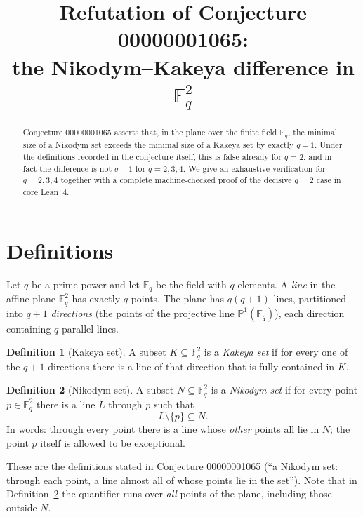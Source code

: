 \documentclass[11pt]{article}
\title{Refutation of Conjecture 00000001065:\\
the Nikodym--Kakeya difference in $\mathbb{F}_q^2$}
\author{}
\date{}
\theoremstyle{definition}
\newtheorem{definition}{Definition}
\theoremstyle{remark}
\begin{document}
\maketitle

\begin{abstract}
Conjecture 00000001065 asserts that, in the plane over the finite field
$\mathbb{F}_q$, the minimal size of a Nikodym set exceeds the minimal size of
a Kakeya set by exactly $q-1$. Under the definitions recorded in the
conjecture itself, this is false already for $q=2$, and in fact the difference
is not $q-1$ for $q=2,3,4$. We give an exhaustive verification for
$q=2,3,4$ together with a complete machine-checked proof of the decisive
$q=2$ case in core Lean~4.
\end{abstract}

\section{Definitions}

Let $q$ be a prime power and let $\mathbb{F}_q$ be the field with $q$
elements. A \emph{line} in the affine plane $\mathbb{F}_q^2$ has exactly $q$
points. The plane has $q(q+1)$ lines, partitioned into $q+1$ \emph{directions}
(the points of the projective line $\mathbb{P}^1(\mathbb{F}_q)$), each
direction containing $q$ parallel lines.

\begin{definition}[Kakeya set]\label{def:kakeya}
A subset $K\subseteq \mathbb{F}_q^2$ is a \emph{Kakeya set} if for every one of
the $q+1$ directions there is a line of that direction that is fully contained
in $K$.
\end{definition}

\begin{definition}[Nikodym set]\label{def:nikodym}
A subset $N\subseteq \mathbb{F}_q^2$ is a \emph{Nikodym set} if for every point
$p\in \mathbb{F}_q^2$ there is a line $L$ through $p$ such that
\[
  L\setminus\{p\}\subseteq N .
\]
In words: through every point there is a line whose \emph{other} points all lie
in $N$; the point $p$ itself is allowed to be exceptional.
\end{definition}

These are the definitions stated in Conjecture 00000001065 (``a Nikodym set:
through each point, a line almost all of whose points lie in the set''). Note
that in Definition~\ref{def:nikodym} the quantifier runs over \emph{all} points
of the plane, including those outside $N$.
\end{document}
